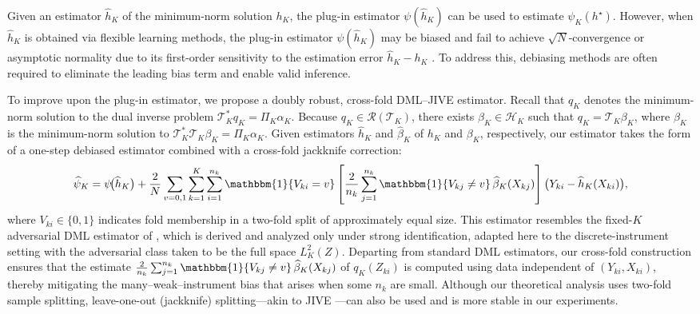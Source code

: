 \documentclass[11pt]{article}
\theoremstyle{plain}
\theoremstyle{definition}
\theoremstyle{remark}
\theoremstyle{definition}
\begin{document}
 
Given an estimator \( \widehat{h}_K \) of the minimum-norm solution \( h_K \), the plug-in estimator \( \psi(\widehat{h}_K) \) can be used to estimate \( \psi_K(h^\star) \). However, when \( \widehat{h}_K \) is obtained via flexible learning methods, the plug-in estimator \( \psi(\widehat{h}_K) \) may be biased and fail to achieve \( \sqrt{N} \)-convergence or asymptotic normality due to its first-order sensitivity to the estimation error \( \widehat{h}_K - h_K \) \citep{bickel1993efficient, vanderLaanRose2011, DoubleML}. To address this, debiasing methods are often required to eliminate the leading bias term and enable valid inference.

 


To improve upon the plug-in estimator, we propose a doubly robust, cross-fold
DML--JIVE estimator. Recall that $q_K$ denotes the minimum-norm solution to the
dual inverse problem $\mathcal{T}_K^{*} q_K = \Pi_K \alpha_K$. Because
$q_K \in \mathcal{R}(\mathcal{T}_K)$, there exists $\beta_K \in \mathcal{H}_K$
such that $q_K = \mathcal{T}_K \beta_K$, where $\beta_K$ is the minimum-norm
solution to $\mathcal{T}_K^{*}\mathcal{T}_K \beta_K = \Pi_K \alpha_K$.
Given estimators $\widehat{h}_K$ and $\widehat{\beta}_K$ of $h_K$ and $\beta_K$,
respectively, our estimator takes the form of a one-step debiased estimator
combined with a cross-fold jackknife correction:
\begin{align*}
  \widehat{\psi}_K 
  = \psi\!\bigl(\widehat{h}_K\bigr) 
    + \frac{2}{N} \sum_{v=0,1} \sum_{k=1}^K \sum_{i=1}^{n_k} 
      \mathbbm{1}\{V_{ki}=v\}
      \left[
        \frac{2}{n_k} \sum_{j=1}^{n_k} 
        \mathbbm{1}\{V_{kj} \neq v\}\,\widehat{\beta}_K(X_{kj})
      \right]
      \bigl(Y_{ki} - \widehat{h}_K(X_{ki})\bigr),
\end{align*}
where $V_{ki} \in \{0,1\}$ indicates fold membership in a two-fold split of
approximately equal size.  
This estimator resembles the fixed-\(K\) adversarial DML estimator of
\citet{bennett2023inference}, which is derived and analyzed only under strong
identification, adapted here to the discrete-instrument setting with the
adversarial class taken to be the full space \(L^2_K(Z)\). Departing from
standard DML estimators, our cross-fold construction ensures that the estimate
\(\frac{2}{n_k}\sum_{j=1}^{n_k}\mathbbm{1}\{V_{kj}\neq v\}\,\widehat{\beta}_K(X_{kj})\)
of \(q_K(Z_{ki})\) is computed using data independent of \((Y_{ki}, X_{ki})\),
thereby mitigating the many–weak–instrument bias that arises when some \(n_k\)
are small. Although our theoretical analysis uses two-fold sample splitting,
leave-one-out (jackknife) splitting---akin to JIVE \citep{angrist1999jackknife}---can
also be used and is more stable in our experiments.
\end{document}
